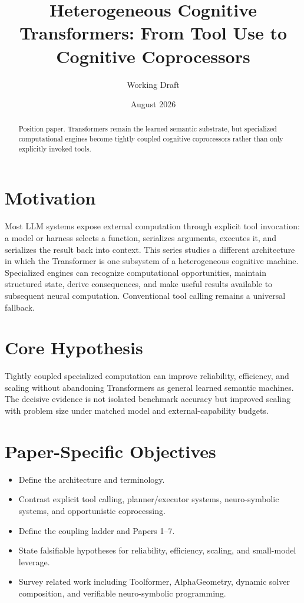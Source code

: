 \documentclass[11pt]{article}
\title{Heterogeneous Cognitive Transformers: From Tool Use to Cognitive Coprocessors}
\author{Working Draft}
\date{August 2026}
\begin{document}
\maketitle
\begin{abstract}
Position paper. Transformers remain the learned semantic substrate, but specialized computational engines become tightly coupled cognitive coprocessors rather than only explicitly invoked tools.
\end{abstract}

\section{Motivation}
Most LLM systems expose external computation through explicit tool invocation: a model or harness selects a function, serializes arguments, executes it, and serializes the result back into context. This series studies a different architecture in which the Transformer is one subsystem of a heterogeneous cognitive machine. Specialized engines can recognize computational opportunities, maintain structured state, derive consequences, and make useful results available to subsequent neural computation. Conventional tool calling remains a universal fallback.

\section{Core Hypothesis}
Tightly coupled specialized computation can improve reliability, efficiency, and scaling without abandoning Transformers as general learned semantic machines. The decisive evidence is not isolated benchmark accuracy but improved scaling with problem size under matched model and external-capability budgets.

\section{Paper-Specific Objectives}
\begin{itemize}
\item Define the architecture and terminology.
\item Contrast explicit tool calling, planner/executor systems, neuro-symbolic systems, and opportunistic coprocessing.
\item Define the coupling ladder and Papers 1–7.
\item State falsifiable hypotheses for reliability, efficiency, scaling, and small-model leverage.
\item Survey related work including Toolformer, AlphaGeometry, dynamic solver composition, and verifiable neuro-symbolic programming.
\end{itemize}
\end{document}
